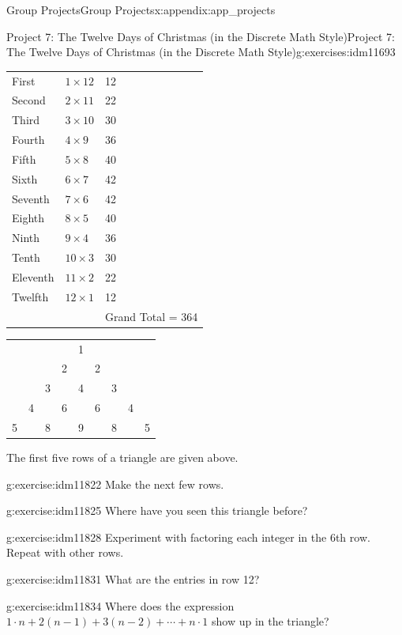 \documentclass[oneside,10pt,]{book}
\numberwithin{equation}{chapter}
\begin{document}
\begin{appendixptx}{Group Projects}{}{Group Projects}{}{}{x:appendix:app_projects}
\begin{exercises-section-numberless}{Project 7: The Twelve Days of Christmas (in the Discrete Math Style)}{}{Project 7: The Twelve Days of Christmas (in the Discrete Math Style)}{}{}{g:exercises:idm11693}
\begin{introduction}{}
\begin{sidebyside}{1}{0.2}{0.2}{0}
\begin{sbspanel}{0.6}
{\begin{tabular}{lll}
First&\(1 \times 12\)&12\tabularnewline[0pt]
Second&\(2 \times 11\)&22\tabularnewline[0pt]
Third&\(3 \times 10\)&30\tabularnewline[0pt]
Fourth&\(4 \times 9\)&36\tabularnewline[0pt]
Fifth&\(5 \times 8\)&40\tabularnewline[0pt]
Sixth&\(6 \times 7\)&42\tabularnewline[0pt]
Seventh&\(7 \times 6\)&42\tabularnewline[0pt]
Eighth&\(8 \times 5\)&40\tabularnewline[0pt]
Ninth&\(9 \times 4\)&36\tabularnewline[0pt]
Tenth&\(10 \times 3\)&30\tabularnewline[0pt]
Eleventh&\(11 \times 2\)&22\tabularnewline[0pt]
Twelfth&\(12 \times 1\)&12\tabularnewline[0pt]
&&Grand Total = 364
\end{tabular}
\par}
\end{sbspanel}%
\end{sidebyside}%
\begin{sidebyside}{1}{0.1}{0.1}{0}%
\begin{sbspanel}{0.8}%
{\centering%
\begin{tabular}{lllllllll}
&&&&1&&&&\tabularnewline[0pt]
&&&2&&2&&&\tabularnewline[0pt]
&&3&&4&&3&&\tabularnewline[0pt]
&4&&6&&6&&4&\tabularnewline[0pt]
5&&8&&9&&8&&5
\end{tabular}
\par}
\end{sbspanel}%
\end{sidebyside}%
\par
The first five rows of a triangle are given above.%
\end{introduction}%
\begin{divisionexercise}{1}{}{}{g:exercise:idm11822}%
Make the next few rows.%
\end{divisionexercise}%
\begin{divisionexercise}{2}{}{}{g:exercise:idm11825}%
Where have you seen this triangle before?%
\end{divisionexercise}%
\begin{divisionexercise}{3}{}{}{g:exercise:idm11828}%
Experiment with factoring each integer in the 6th row. Repeat with other rows.%
\end{divisionexercise}%
\begin{divisionexercise}{4}{}{}{g:exercise:idm11831}%
What are the entries in row 12?%
\end{divisionexercise}%
\begin{divisionexercise}{5}{}{}{g:exercise:idm11834}%
Where does the expression \(1 \cdot n + 2\left( n - 1 \right) + 3\left( n - 2 \right) + \cdots + n \cdot 1\) show up in the triangle?%
\end{divisionexercise}%

\end{exercises-section-numberless}
\end{appendixptx}
\end{document}
